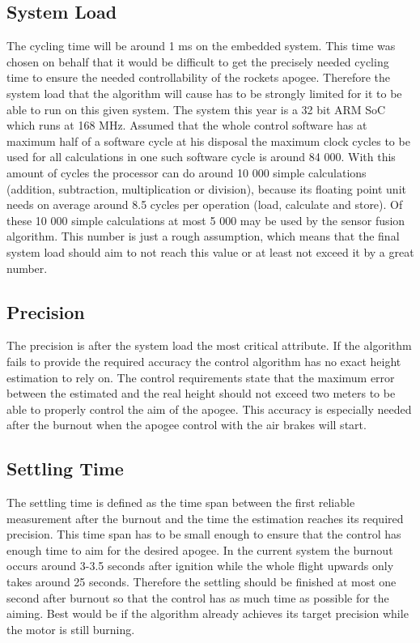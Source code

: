  \subsection{System Load}
 The cycling time will be around 1 ms on the embedded system. This time was chosen on behalf that it would be difficult to get the precisely needed cycling time to ensure the needed controllability of the rockets apogee.
 Therefore the system load that the algorithm will cause has to be strongly limited for it to be able to run on this given system.
 The system this year is a 32 bit ARM SoC which runs at 168 MHz. Assumed that the whole control software has at maximum half of a software cycle at his disposal the maximum clock cycles to be used for all calculations in one such software cycle is around 84 000.
 With this amount of cycles the processor can do around 10 000 simple calculations (addition, subtraction, multiplication or division),
 because its floating point unit needs on average around 8.5 cycles per operation (load, calculate and store). Of these 10 000 simple calculations at most 5 000 may be used by the sensor fusion algorithm.
 This number is just a rough assumption, which means that the final system load should aim to not reach this value or at least not exceed it by a great number.

 \subsection{Precision}
 The precision is after the system load the most critical attribute. If the algorithm fails to provide the required accuracy the control algorithm has no exact height estimation to rely on.
 The control requirements state that the maximum error between the estimated and the real height should not exceed two meters to be able to properly control the aim of the apogee.
 This accuracy is especially needed after the burnout when the apogee control with the air brakes will start.

 \subsection{Settling Time}
 The settling time is defined as the time span between the first reliable measurement after the burnout and the time  the estimation reaches its required precision.
 This time span has to be small enough to ensure that the control has enough time to aim for the desired apogee. In the current system the burnout occurs around 3-3.5 seconds after ignition while the whole flight upwards only takes around 25 seconds. Therefore the settling should be finished at most
 one second after burnout so that the control has as much time as possible for the aiming. Best would be if the algorithm already achieves its target precision while the motor is still burning.

